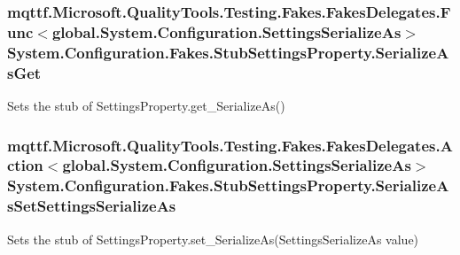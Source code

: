 \hypertarget{class_system_1_1_configuration_1_1_fakes_1_1_stub_settings_property_aeaa760d97f366560ef2a62054c13bf2c}{
\subsubsection[{Serialize\-As\-Get}]{\setlength{\rightskip}{0pt plus 5cm}mqttf.\-Microsoft.\-Quality\-Tools.\-Testing.\-Fakes.\-Fakes\-Delegates.\-Func$<$global.\-System.\-Configuration.\-Settings\-Serialize\-As$>$ System.\-Configuration.\-Fakes.\-Stub\-Settings\-Property.\-Serialize\-As\-Get}}\label{class_system_1_1_configuration_1_1_fakes_1_1_stub_settings_property_aeaa760d97f366560ef2a62054c13bf2c}


Sets the stub of Settings\-Property.\-get\-\_\-\-Serialize\-As()

\hypertarget{class_system_1_1_configuration_1_1_fakes_1_1_stub_settings_property_a244685ebe2df32776dc6578f48d97156}{
\subsubsection[{Serialize\-As\-Set\-Settings\-Serialize\-As}]{\setlength{\rightskip}{0pt plus 5cm}mqttf.\-Microsoft.\-Quality\-Tools.\-Testing.\-Fakes.\-Fakes\-Delegates.\-Action$<$global.\-System.\-Configuration.\-Settings\-Serialize\-As$>$ System.\-Configuration.\-Fakes.\-Stub\-Settings\-Property.\-Serialize\-As\-Set\-Settings\-Serialize\-As}}\label{class_system_1_1_configuration_1_1_fakes_1_1_stub_settings_property_a244685ebe2df32776dc6578f48d97156}


Sets the stub of Settings\-Property.\-set\-\_\-\-Serialize\-As(\-Settings\-Serialize\-As value)



